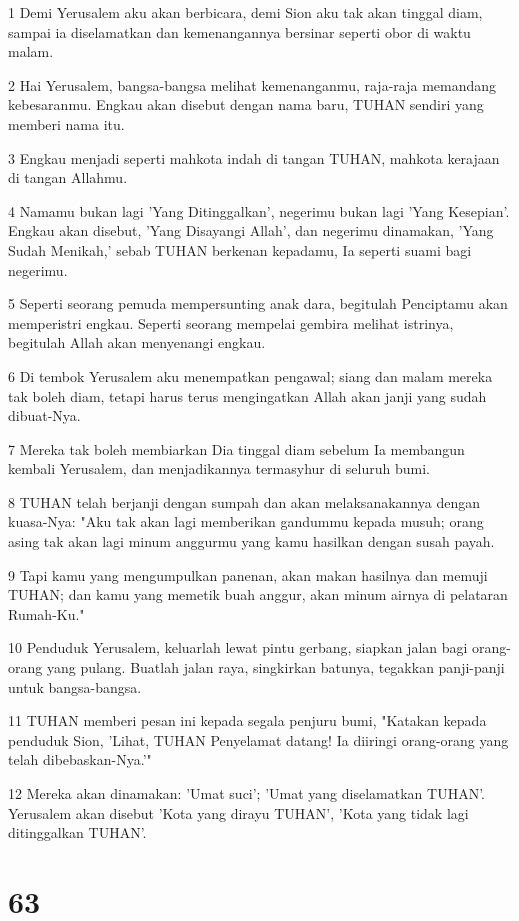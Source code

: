 \par 1 Demi Yerusalem aku akan berbicara, demi Sion aku tak akan tinggal diam, sampai ia diselamatkan dan kemenangannya bersinar seperti obor di waktu malam.
\par 2 Hai Yerusalem, bangsa-bangsa melihat kemenanganmu, raja-raja memandang kebesaranmu. Engkau akan disebut dengan nama baru, TUHAN sendiri yang memberi nama itu.
\par 3 Engkau menjadi seperti mahkota indah di tangan TUHAN, mahkota kerajaan di tangan Allahmu.
\par 4 Namamu bukan lagi 'Yang Ditinggalkan', negerimu bukan lagi 'Yang Kesepian'. Engkau akan disebut, 'Yang Disayangi Allah', dan negerimu dinamakan, 'Yang Sudah Menikah,' sebab TUHAN berkenan kepadamu, Ia seperti suami bagi negerimu.
\par 5 Seperti seorang pemuda mempersunting anak dara, begitulah Penciptamu akan memperistri engkau. Seperti seorang mempelai gembira melihat istrinya, begitulah Allah akan menyenangi engkau.
\par 6 Di tembok Yerusalem aku menempatkan pengawal; siang dan malam mereka tak boleh diam, tetapi harus terus mengingatkan Allah akan janji yang sudah dibuat-Nya.
\par 7 Mereka tak boleh membiarkan Dia tinggal diam sebelum Ia membangun kembali Yerusalem, dan menjadikannya termasyhur di seluruh bumi.
\par 8 TUHAN telah berjanji dengan sumpah dan akan melaksanakannya dengan kuasa-Nya: "Aku tak akan lagi memberikan gandummu kepada musuh; orang asing tak akan lagi minum anggurmu yang kamu hasilkan dengan susah payah.
\par 9 Tapi kamu yang mengumpulkan panenan, akan makan hasilnya dan memuji TUHAN; dan kamu yang memetik buah anggur, akan minum airnya di pelataran Rumah-Ku."
\par 10 Penduduk Yerusalem, keluarlah lewat pintu gerbang, siapkan jalan bagi orang-orang yang pulang. Buatlah jalan raya, singkirkan batunya, tegakkan panji-panji untuk bangsa-bangsa.
\par 11 TUHAN memberi pesan ini kepada segala penjuru bumi, "Katakan kepada penduduk Sion, 'Lihat, TUHAN Penyelamat datang! Ia diiringi orang-orang yang telah dibebaskan-Nya.'"
\par 12 Mereka akan dinamakan: 'Umat suci'; 'Umat yang diselamatkan TUHAN'. Yerusalem akan disebut 'Kota yang dirayu TUHAN', 'Kota yang tidak lagi ditinggalkan TUHAN'.

\chapter{63}

